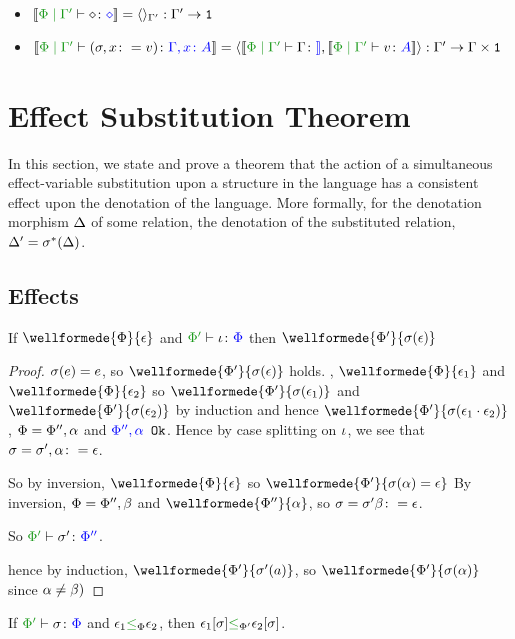 \documentclass{report}
\begin{document}
\begin{itemize}
    \item $\deno{\etyperelation{\P}{\G'}{\nil}{\nil}} = \term{\G'}: \G' \rightarrow \1$
    \item $\deno{\etyperelation{\P}{\G'}{(\si, x \setto v)}{\gax}} = \pr{\deno{\etyperelation{\P}{\G'}{\G}}}{\deno{\etyperelation{\P}{\G'}{v}{A}}}: \G' \rightarrow \G\times \1$
\end{itemize}

\chapter{Effect Substitution Theorem}
In this section, we state and prove a theorem that the action of a simultaneous effect-variable substitution upon a structure in the language has a consistent effect upon the denotation of the language. More formally, for the denotation morphism $\Delta$ of some relation, the denotation of the substituted relation, $\Delta' = \sigma^*(\Delta)$.


\section{Effects}

\begin{theorem}
    If $\wellformede{\P}{\e}$ and $\typerelation{\P'}{\i}{\P}$ then $\wellformede{\P'}{\si(\e)}$   
\end{theorem}

\begin{framed}
    \begin{proof}
        \case{\eground}
        $\sigma(e) = e$, so $\wellformede{\P'}{\si(\e)}$ holds.
        \case{\ecompose}
        \bi, $\wellformede{\P}{\e_1}$ and $\wellformede{\P}{\e_2}$ so $\wellformede{\P'}{\si(\e_1)}$ and $\wellformede{\P'}{\si(\e_2)}$ by induction and hence $\wellformede{\P'}{\si(\e_1\dot\e_2)}$
        \case{\evar}
        \bi, $\Phi=\Phi'',\alpha$ and ${\color{blue} \Phi'',\alpha} \texttt{ Ok}$. Hence by case splitting on $\iota$, we see that $\sigma=\sigma', \alpha\colon=\epsilon$.
        
        So by inversion, $\wellformede{\P}{\e}$ so $\wellformede{\P'}{\si(\a)=\e}$
        \case{\eweaken}
        By inversion,  $\Phi=\Phi'', \beta$ and $\wellformede{\P''}{\a}$, so $\sigma=\sigma'\beta\colon=\epsilon$.
        
        So $\typerelation{\P'}{\si'}{\P''}$.
        
        hence by induction, $\wellformede{\P'}{\si'(a)}$, so $\wellformede{\P'}{\si(\a)}$ since $\alpha\neq\beta)$
    \end{proof}
    
\end{framed}
\begin{theorem}
    If $\typerelation{\P'}{\si}{\P}$ and $\e_1\subeffectp\e_2$, then $\e_1\ssi\subeffect_{\P'}\e_2\ssi$.
\end{theorem}
\end{document}
